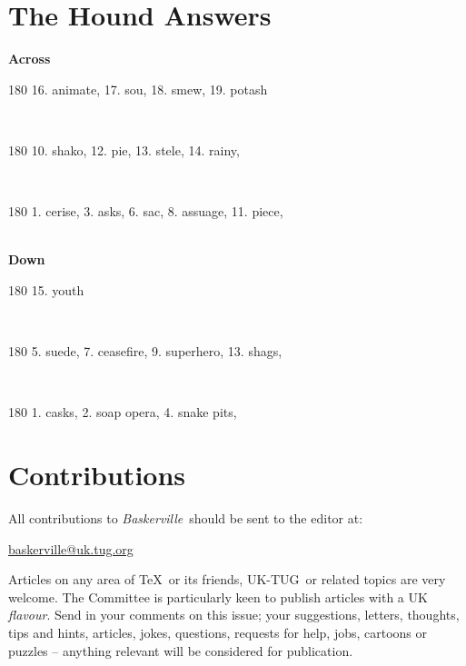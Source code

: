 \documentclass[a4paper,twoside,twocolumn]{article}
\def \ukt {UK-TUG}
\newcommand{\BV}{\textit{Baskerville}}
\begin{document}





\section{The Hound Answers}

\noindent \textbf{Across} \\
\begin{turn}{180} 
 16. animate,
 17. sou,
 18. smew,
 19. potash
\end{turn} \\
\begin{turn}{180}
 10. shako,
 12. pie,
 13. stele,
 14. rainy,
 \end{turn} \\
\begin{turn}{180}
 1. cerise,
 3. asks,
 6. sac,
 8. assuage,
 11. piece,
\end{turn} \\

\noindent \textbf{Down} \\
\begin{turn}{180}
15. youth
\end{turn} \\
\begin{turn}{180}
5. suede,
7. ceasefire,
9. superhero,
13. shags,
\end{turn} \\
\begin{turn}{180}
1. casks,
2. soap opera,
4. snake pits,
\end{turn}

\section{Contributions}
\noindent All contributions to \BV\ should be sent to the editor at:
\begin{center}
\href{mailto:baskerville@uk.tug.org}{baskerville@uk.tug.org}
\end{center}

Articles on any area of \TeX\ or its friends, \ukt\ or related topics are very welcome. The Committee is particularly keen to publish articles with a UK \textit{flavour}. Send in your comments on this issue; your suggestions, letters, thoughts, tips and hints, articles, jokes, questions, requests for help, jobs, cartoons or puzzles -- anything relevant will be considered for publication.

\end{document}
